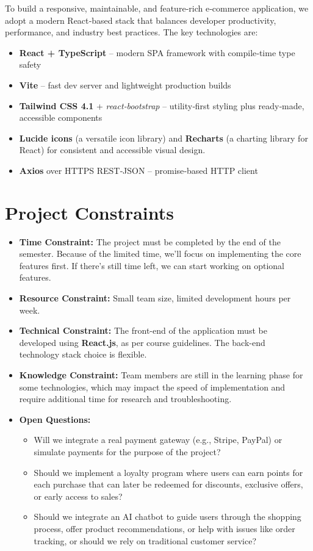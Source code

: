 \documentclass[a4paper,12pt]{article}
\begin{document}
To build a responsive, maintainable, and feature‑rich e‑commerce
application, we adopt a modern React‑based stack that balances developer
productivity, performance, and industry best practices.
The key technologies are:


\begin{itemize}
	\item \textbf{React + TypeScript} – modern SPA framework with compile‑time type safety
	\item \textbf{Vite} – fast dev server and lightweight production builds
	\item \textbf{Tailwind CSS 4.1} + \textit{react‑bootstrap} – utility‑first styling plus ready‑made, accessible components
	\item \textbf{Lucide icons} (a versatile icon library) and \textbf{Recharts} (a charting library for React) for consistent and accessible visual design.
	\item \textbf{Axios} over HTTPS REST‑JSON – promise‑based HTTP client
\end{itemize}




\section{Project Constraints}
	\begin{itemize}
		\item \textbf{Time Constraint:}  The project must be completed by the end of the semester.
		Because of the limited time, we'll focus on implementing the core features first. If there's
		still time left, we can start working on optional features.
		\item \textbf{Resource Constraint:} Small team size, limited development hours per week.
		\item \textbf{Technical Constraint:} The front-end of the application must be \\ developed using
		\textbf{React.js}, as per course guidelines. The back-end \\ technology stack choice is flexible.
		\item \textbf{Knowledge Constraint:} Team members are still in the learning phase for some
		technologies, which may impact the speed of implementation and require additional time for
		research and troubleshooting.
		\item \textbf{Open Questions:}
		\begin{itemize}
			\item Will we integrate a real payment gateway (e.g., Stripe, PayPal) or simulate payments
			for the purpose of the project?
			\item Should we implement a loyalty program where users can earn points for each purchase
			that can later be redeemed for discounts, exclusive offers, or early access to sales?
			\item Should we integrate an AI chatbot to guide users through the shopping process, offer
			product recommendations, or help with issues like order tracking, or should we rely on
			traditional customer service?
		\end{itemize}
	\end{itemize}
\end{document}
